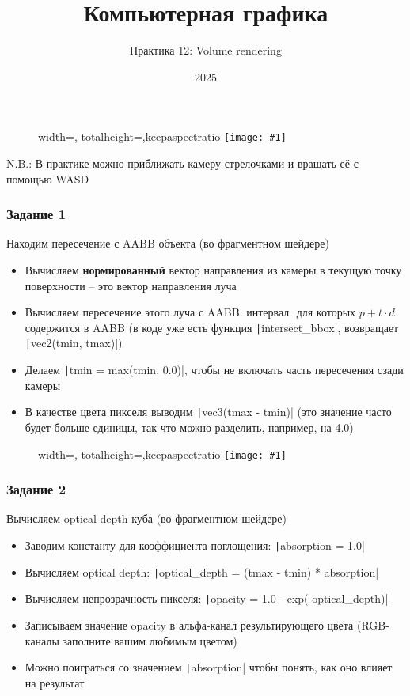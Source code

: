 \documentclass[10pt]{beamer}
\title{Компьютерная графика}
\subtitle{Практика 12: Volume rendering}
\date{2025}
\newcommand{\slideimage}[1]{
  \begin{figure}
    \begin{adjustbox}{width=\textwidth, totalheight=\textheight-2\baselineskip-2\baselineskip,keepaspectratio}
      \texttt{[image: \#1]}
    \end{adjustbox}
  \end{figure}
}
\begin{document}
\frame{\titlepage}

\begin{frame}[fragile]
\slideimage{0.png}
\end{frame}

\begin{frame}[fragile]
N.B.: В практике можно приближать камеру стрелочками и вращать её с помощью WASD
\end{frame}

\begin{frame}[fragile]
\frametitle{Задание 1}
Находим пересечение с AABB объекта (во фрагментном шейдере)
\begin{itemize}
\item Вычисляем \textbf{нормированный} вектор направления из камеры в текущую точку поверхности -- это вектор направления луча
\item Вычисляем пересечение этого луча с AABB: интервал \begin{math}[t_{min}, t_{max}]\end{math} для которых \begin{math}p + t \cdot d\end{math} содержится в AABB (в коде уже есть функция \texttt|intersect_bbox|, возвращает \texttt|vec2(tmin, tmax)|)
\item Делаем \texttt|tmin = max(tmin, 0.0)|, чтобы не включать часть пересечения сзади камеры
\item В качестве цвета пикселя выводим \texttt|vec3(tmax - tmin)| (это значение часто будет больше единицы, так что можно разделить, например, на 4.0)
\end{itemize}
\end{frame}

\begin{frame}[fragile]
\slideimage{1.png}
\end{frame}

\begin{frame}[fragile]
\frametitle{Задание 2}
Вычисляем optical depth куба (во фрагментном шейдере)
\begin{itemize}
\item Заводим константу для коэффициента поглощения: \texttt|absorption = 1.0|
\item Вычисляем optical depth: \texttt|optical_depth = (tmax - tmin) * absorption|
\item Вычисляем непрозрачность пикселя: \texttt|opacity = 1.0 - exp(-optical_depth)|
\item Записываем значение opacity в альфа-канал результирующего цвета (RGB-каналы заполните вашим любимым цветом)
\item Можно поиграться со значением \texttt|absorption| чтобы понять, как оно влияет на результат
\end{itemize}
\end{frame}
\end{document}
